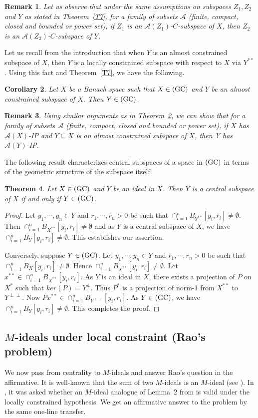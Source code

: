 \documentclass[11pt]{amsart}
\newtheorem{thm}{Theorem}[section]
\newtheorem{cor}[thm]{Corollary}
\newtheorem{rem}[thm]{Remark}
\newcommand{\es}{\emptyset}
\newcommand{\ci}{\subseteq}
\newcommand{\mc}{\mathcal}
\newcommand{\GC}{{\mbox{\rm (GC)}}}
\begin{document}
\begin{rem}
Let us observe that under the same assumptions on subspaces $Z_1,Z_2$ and $Y$ as stated in Theorem~\ref{T7}, for a family of subsets $\mc{A}$ (finite, compact, closed and bounded or power set), if  $Z_1$ is an $\mc{A}(Z_1)$-$C$-subspace of $X$, then $Z_2$ is an $\mc{A}(Z_2)$-$C$-subspace of $Y$.
\end{rem}
Let us recall from the introduction that when $Y$ is an almost constrained subspace of $X$, then $Y$ is a locally constrained subspace with respect to $X$ via $Y^{**}$. Using this fact and Theorem~\ref{T7}, we have the following.
\begin{cor}\label{C2}
Let $X$ be a Banach space such that $X\in\GC$ and  $Y$ be an almost constrained subspace of $X$. Then $Y\in\GC$.
\end{cor}

\begin{rem}
Using similar arguments as in Theorem~\ref{C2}, we can show that for a family of subsets $\mc{A}$ (finite, compact, closed and bounded or power set), if $X$ has $\mc{A}(X)$-IP and $Y\ci X$ is an almost constrained subspace of $X$, then Y has $\mc{A}(Y)$-IP.
\end{rem}
The following result characterizes central subspaces of a space in $\GC$ in terms of the geometric structure of the subspace itself.
\begin{thm}
Let $X\in\GC$ and $Y$ be an ideal in $X$. Then $Y$ is a central subspace of $X$ if and only if $Y\in \GC$.
\end{thm}
\begin{proof}
Let $y_1,\cdots,y_n\in Y$ and $r_1,\cdots,r_n>0$ be such that $\cap_{i=1}^nB_{Y^{**}}[y_i,r_i]\neq\es$. Then $\cap_{i=1}^nB_{X^{**}}[y_i,r_i]\neq\es$ and as $Y$ is a central subspace of $X$, we have $\cap_{i=1}^nB_Y[y_i,r_i]\neq\es$. This establishes our assertion.

Conversely, suppose $Y\in\GC$. Let $y_1,\cdots,y_n\in Y$ and $r_1,\cdots,r_n>0$ be such that $\cap_{i=1}^nB_X[y_i,r_i]\neq\es$. Hence $\cap_{i=1}^nB_{X^{**}}[y_i,r_i]\neq\es$. Let $x^{**}\in\cap_{i=1}^nB_{X^{**}}[y_i,r_i]$. As $Y$ is an ideal in $X$, there exists a projection of $P$ on $X^*$ such that $ker(P)=Y^\perp$. Thus $P^*$ is a projection of norm-1 from $X^{**}$ to $Y^{\perp\perp}$. Now $Px^{**}\in\cap_{i=1}^nB_{Y^{\perp\perp}}[y_i,r_i]$. As $Y\in\GC$, we have $\cap_{i=1}^nB_Y[y_i,r_i]\neq\es$. This completes the proof.
\end{proof}
\subsection{$M$-ideals under local constraint (Rao's problem)}
We now pass from centrality to $M$-ideals and answer Rao's question in the affirmative.
It is well-known that the sum of two $M$-ideals is an $M$-ideal (see \cite{H}). In  \cite{Rao}, it was asked whether an $M$-ideal analogue of Lemma~2 from \cite{Rao} is valid under the locally constrained hypothesis. We get an affirmative answer to the problem 
by the same one-line transfer.
\end{document}
